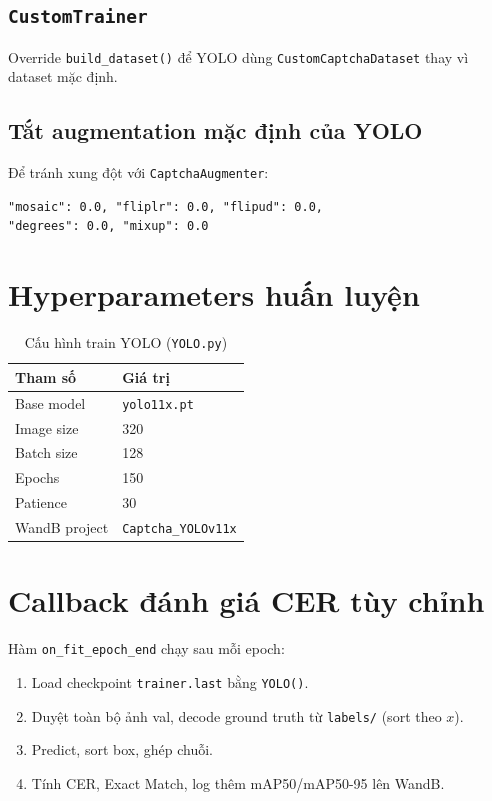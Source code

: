 \documentclass[a4paper,12pt]{report}
\begin{document}
\subsection{\texttt{CustomTrainer}}
Override \texttt{build\_dataset()} để YOLO dùng \texttt{CustomCaptchaDataset} thay vì dataset mặc định.

\subsection{Tắt augmentation mặc định của YOLO}
Để tránh xung đột với \texttt{CaptchaAugmenter}:
\begin{lstlisting}
"mosaic": 0.0, "fliplr": 0.0, "flipud": 0.0,
"degrees": 0.0, "mixup": 0.0
\end{lstlisting}

\section{Hyperparameters huấn luyện}
\begin{table}[H]
  \centering
  \caption{Cấu hình train YOLO (\texttt{YOLO.py})}
  \begin{tabular}{ll}
    \toprule
    \textbf{Tham số} & \textbf{Giá trị} \\
    \midrule
    Base model & \texttt{yolo11x.pt} \\
    Image size & 320 \\
    Batch size & 128 \\
    Epochs & 150 \\
    Patience & 30 \\
    WandB project & \texttt{Captcha\_YOLOv11x} \\
    \bottomrule
  \end{tabular}
\end{table}

\section{Callback đánh giá CER tùy chỉnh}
Hàm \texttt{on\_fit\_epoch\_end} chạy sau mỗi epoch:
\begin{enumerate}[leftmargin=*]
  \item Load checkpoint \texttt{trainer.last} bằng \texttt{YOLO()}.
  \item Duyệt toàn bộ ảnh val, decode ground truth từ \texttt{labels/} (sort theo $x$).
  \item Predict, sort box, ghép chuỗi.
  \item Tính CER, Exact Match, log thêm mAP50/mAP50-95 lên WandB.
\end{enumerate}
\end{document}
